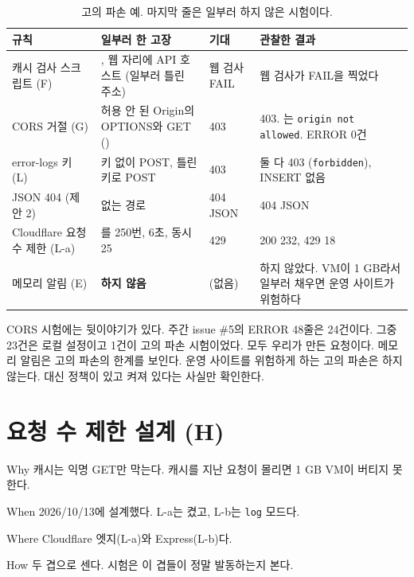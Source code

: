 \begin{table}[H]
  \caption{고의 파손 예. 마지막 줄은 일부러 하지 않은 시험이다.}\label{tab:07-breakage}
  \footnotesize
  \begin{tabularx}{\linewidth}{L{3.2cm} L{3.5cm} L{2.6cm} Y}
    \toprule
    규칙 & 일부러 한 고장 & 기대 & 관찰한 결과 \\
    \midrule
    캐시 검사 스크립트 (F) & , 웹 자리에 API 호스트 (일부러 틀린 주소) & 웹 검사 FAIL & 웹 검사가 FAIL을 찍었다 \\
    \midrule
    CORS 거절 (G) & 허용 안 된 Origin의 OPTIONS와 GET () & 403 & 403. 는 \texttt{origin not allowed}. ERROR 0건 \\
    \midrule
    error-logs 키 (L) & 키 없이 POST, 틀린 키로 POST & 403 & 둘 다 403 (\texttt{forbidden}), INSERT 없음 \\
    \midrule
    JSON 404 (제안 2) & 없는 경로  & 404 JSON & 404 JSON \\
    \midrule
    Cloudflare 요청 수 제한 (L-a) & \code{/}를 250번, 6초, 동시 25 & 429 & 200 232, 429 18 \\
    \midrule
    메모리 알림 (E) & \textbf{하지 않음} & (없음) & 하지 않았다. VM이 1 GB라서 일부러 채우면 운영 사이트가 위험하다 \\
    \bottomrule
  \end{tabularx}
\end{table}

CORS 시험에는 뒷이야기가 있다.
주간 issue \#5의 ERROR 48줄은 24건이다.
그중 23건은 로컬 설정이고 1건이 고의 파손 시험이었다.
모두 우리가 만든 요청이다.
메모리 알림은 고의 파손의 한계를 보인다.
운영 사이트를 위험하게 하는 고의 파손은 하지 않는다.
대신 정책이 있고 켜져 있다는 사실만 확인한다.

\section{요청 수 제한 설계 (H)}\label{sec:07-ratelimit-design}

\begin{inbrief}
  \item[Why] 캐시는 익명 GET만 막는다. 캐시를 지난 요청이 몰리면 1 GB VM이 버티지 못한다.
  \item[When] 2026/10/13에 설계했다. L-a는 켰고, L-b는 \texttt{log} 모드다.
  \item[Where] Cloudflare 엣지(L-a)와 Express(L-b)다.
  \item[How] 두 겹으로 센다. 시험은 이 겹들이 정말 발동하는지 본다.
\end{inbrief}

